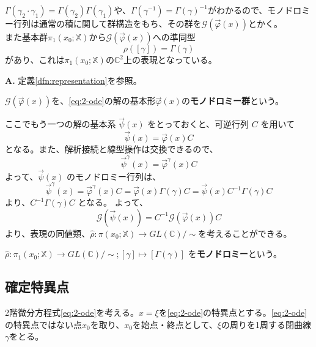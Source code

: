 $\Gamma(\gamma_{2}\cdot\gamma_{1})=\Gamma(\gamma_{2})\Gamma(\gamma_{1})$や、$\Gamma(\gamma^{-1})=\Gamma(\gamma)^{-1}$がわかるので、モノドロミー行列は通常の積に関して群構造をもち、その群を$\mathcal{G}(\vec{\varphi}(x))$とかく。\\
また基本群$\pi_1(x_{0};\mathbb{X})$から$\mathcal{G}(\vec{\varphi}(x))$への準同型
\[
\rho([\gamma])=\Gamma(\gamma)
\]
があり、これは$\pi_1(x_{0};\mathbb{X})$の$\mathbb{C}^{2}$上の表現となっている。

\begin{Q}
\textbf{A.} 定義\ref{dfn:representation}を参照。\\
\end{Q}

\begin{definition}
    $\mathcal{G}(\vec{\varphi}(x))$を、\eqref{eq:2-ode}の解の基本形$\vec{\varphi}(x)$の\textbf{モノドロミー群}という。
\end{definition}

ここでもう一つの解の基本系 $\vec{\psi}(x)$ をとっておくと、可逆行列 $C$ を用いて
\[
\vec{\psi}(x) = \vec{\varphi}(x)C
\]
となる。また、解析接続と線型操作は交換できるので、
\[
\vec{\psi}^{\gamma}(x) = \vec{\varphi}^{\gamma}(x)C
\]
よって、$\vec{\psi}(x)$ のモノドロミー行列は、
\begin{equation}\label{eq:monodromy_change_of_basis}
\vec{\psi}^{\gamma}(x) = \vec{\varphi}^{\gamma}(x)C= \vec{\varphi}(x)\Gamma(\gamma)C = \vec{\psi}(x)C^{-1}\Gamma(\gamma)C
\end{equation}
より、$C^{-1}\Gamma(\gamma)C$ となる。
よって、
\[
\mathcal{G}(\vec{\psi}(x))=C^{-1}\mathcal{G}(\vec{\varphi}(x))C
\]
より、表現の同値類、$\hat{\rho}:\pi(x_{0};\mathbb{X})\to GL(\mathbb{C})/\sim$を考えることができる。

\begin{definition}[モノドロミー]\label{def:monodromy}
     $\hat{\rho} : \pi_{1}(x_{0};\mathbb{X})\to GL(\mathbb{C})/\sim ; [\gamma] \mapsto [\Gamma(\gamma)]$ を\textbf{モノドロミー}という。
\end{definition}

\subsection{確定特異点}
2階微分方程式\eqref{eq:2-ode}を考える。$x=\xi$を\eqref{eq:2-ode}の特異点とする。\eqref{eq:2-ode}の特異点ではない点$x_{0}$を取り、$x_{0}$を始点・終点として、$\xi$の周りを1周する閉曲線$\gamma$をとる。

